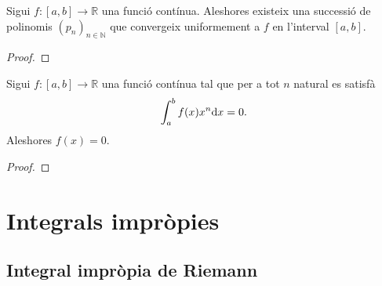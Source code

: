 \documentclass[../Apunts.tex]{subfiles}
\begin{document}
	\begin{theorem}
		\label{thm:Teorema d'aproximació polinòmica de Weierstrass}
		Sigui \(f\colon[a,b]\longrightarrow\mathbb{R}\) una funció contínua. Aleshores existeix una successió de polinomis \((p_{n})_{n\in\mathbb{N}}\) que convergeix uniformement a \(f\) en l'interval \([a,b]\).
		\begin{proof}
		\end{proof}
	\end{theorem}
	\begin{corollary}
		Sigui \(f\colon[a,b]\longrightarrow\mathbb{R}\) una funció contínua tal que per a tot \(n\) natural es satisfà
		\[\int_{a}^{b}f(x)x^{n}\mathrm{d} x=0.\]
		Aleshores \(f(x)=0\).
		\begin{proof}
		\end{proof}
	\end{corollary}
\chapter{Integrals impròpies}
\section{Integral impròpia de Riemann}
\end{document}
